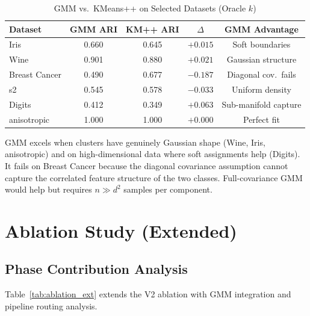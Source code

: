 \documentclass[journal]{IEEEtran}
\begin{document}
\begin{table}[!t]
\caption{GMM vs.\ KMeans++ on Selected Datasets (Oracle $k$)}
\label{tab:gmm_detail}
\centering
\renewcommand{\arraystretch}{1.1}
\small
\begin{tabular}{lcccc}
\toprule
Dataset & GMM ARI & KM++ ARI & $\Delta$ & GMM Advantage \\
\midrule
Iris & 0.660 & 0.645 & $+0.015$ & Soft boundaries \\
Wine & 0.901 & 0.880 & $+0.021$ & Gaussian structure \\
Breast Cancer & 0.490 & 0.677 & $-0.187$ & Diagonal cov.\ fails \\
s2 & 0.545 & 0.578 & $-0.033$ & Uniform density \\
Digits & 0.412 & 0.349 & $+0.063$ & Sub-manifold capture \\
anisotropic & 1.000 & 1.000 & $+0.000$ & Perfect fit \\
\bottomrule
\end{tabular}
\end{table}

GMM excels when clusters have genuinely Gaussian shape (Wine, Iris, anisotropic) and on high-dimensional data where soft assignments help (Digits). It fails on Breast Cancer because the diagonal covariance assumption cannot capture the correlated feature structure of the two classes. Full-covariance GMM would help but requires $n \gg d^2$ samples per component.

\section{Ablation Study (Extended)}
\label{sec:ablation}

\subsection{Phase Contribution Analysis}

Table~\ref{tab:ablation_ext} extends the V2 ablation with GMM integration and pipeline routing analysis.
\end{document}
